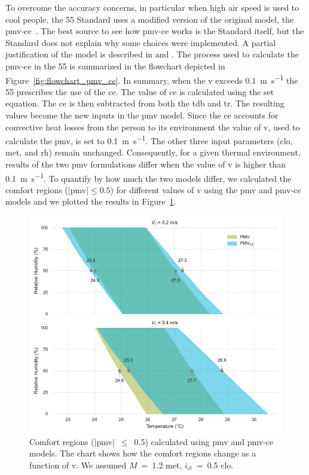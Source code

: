 To overcome the accuracy concerns, in particular when high air speed is used to cool people, the \gls{55} Standard uses a modified version of the original model, the \ac{pmv-ce}~\cite{ashrae552023}.
The best source to see how \ac{pmv-ce} works is the Standard itself, but the Standard does not explain why some choices were implemented.
A partial justification of the model is described in  and .
The process used to calculate the \ac{pmv-ce} in the \gls{55} is summarized in the flowchart depicted in Figure~\ref{fig:flowchart_pmv_ce}.
In summary, when the \ac{v} exceeds \qty{0.1}{\m\per\s} the \gls{55} prescribes the use of the \ac{ce}.
The value of \ac{ce} is calculated using the \ac{set} equation.
The \ac{ce} is then subtracted from both the \ac{tdb} and \ac{tr}.
The resulting values become the new inputs in the \ac{pmv} model.
Since the \ac{ce} accounts for  convective heat losses from the person to its environment the value of \ac{v}, used to calculate the \ac{pmv}, is set to \qty{0.1}{\m\per\s}.
The other three input parameters (\ac{clo}, \ac{met}, and \ac{rh}) remain unchanged.
Consequently, for a given thermal environment, results of the two \ac{pmv} formulations differ when the value of \ac{v} is higher than \qty{0.1}{\m\per\s}.
To quantify by how much the two models differ, we calculated the comfort regions ($\mid$\ac{pmv}$\mid \leq 0.5$) for different values of \ac{v} using the \ac{pmv} and \ac{pmv-ce} models and we plotted the results in Figure~\ref{fig:comfort_regios_pmv_pmvce}.
\begin{figure}[!htb]
    \centering
    \includegraphics[width=1\textwidth]{figures/pmv_comfort_regions}
    \caption{Comfort regions ($|$\ac{pmv}$|$~$\leq$~\num{0.5}) calculated using \ac{pmv} and \ac{pmv-ce} models.
    The chart shows how the comfort regions change as a function of \ac{v}.
    We assumed $M$~=~1.2 met, $i_{cl}$~=~0.5 clo.
    \label{fig:comfort_regios_pmv_pmvce}}
\end{figure}

